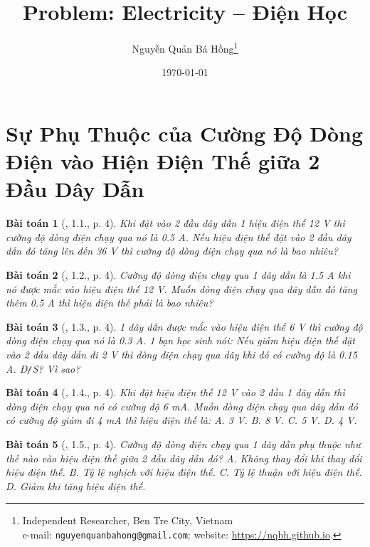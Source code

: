\documentclass{article}
\title{Problem: Electricity -- Điện Học}
\author{Nguyễn Quản Bá Hồng\footnote{Independent Researcher, Ben Tre City, Vietnam\\e-mail: \texttt{nguyenquanbahong@gmail.com}; website: \url{https://nqbh.github.io}.}}
\date{\today}
\newtheorem{baitoan}{Bài toán}
\begin{document}
\maketitle
\begin{abstract}
	
\end{abstract}
\tableofcontents
\newpage


\section{Sự Phụ Thuộc của Cường Độ Dòng Điện vào Hiện Điện Thế giữa 2 Đầu Dây Dẫn}

\begin{baitoan}[\cite{SBT_Vat_Ly_9}, 1.1., p. 4]
	Khi đặt vào 2 đầu dây dẫn 1 hiệu điện thế \emph{12 V} thì cường độ dòng điện chạy qua nó là \emph{0.5 A}. Nếu hiệu điện thế đặt vào 2 đầu dây dẫn đó tăng lên đến \emph{36 V} thì cường độ dòng điện chạy qua nó là bao nhiêu?
\end{baitoan}

\begin{baitoan}[\cite{SBT_Vat_Ly_9}, 1.2., p. 4]
	Cường độ dòng điện chạy qua 1 dây dẫn là \emph{1.5 A} khi nó được mắc vào hiệu điện thế \emph{12 V}. Muốn dòng điện chạy qua dây dẫn đó tăng thêm \emph{0.5 A} thì hiệu điện thế phải là bao nhiêu?
\end{baitoan}

\begin{baitoan}[\cite{SBT_Vat_Ly_9}, 1.3., p. 4]
	1 dây dẫn được mắc vào hiệu điện thế \emph{6 V} thì cường độ dòng điện chạy qua nó là \emph{0.3 A}. 1 bạn học sinh nói: Nếu giảm hiệu điện thế đặt vào 2 đầu dây dẫn đi \emph{2 V} thì dòng điện chạy qua dây khi đó có cường độ là \emph{0.15 A}. \emph{Đ\texttt{/}S}? Vì sao?
\end{baitoan}

\begin{baitoan}[\cite{SBT_Vat_Ly_9}, 1.4., p. 4]
	Khi đặt hiệu điện thế \emph{12 V} vào 2 đầu 1 dây dẫn thì dòng điện chạy qua nó có cường độ \emph{6 mA}. Muốn dòng điện chạy qua dây dẫn đó có cường độ giảm đi \emph{4 mA} thì hiệu điện thế là: {\sf A.} \emph{3 V}. {\sf B.} \emph{8 V}. {\sf C.} \emph{5 V}. {\sf D.} \emph{4 V}.
\end{baitoan}

\begin{baitoan}[\cite{SBT_Vat_Ly_9}, 1.5., p. 4]
	Cường độ dòng điện chạy qua 1 dây dẫn phụ thuộc như thế nào vào hiệu điện thế giữa 2 đầu dây dẫn đó? {\sf A.} Không thay đổi khi thay đổi hiệu điện thế. {\sf B.} Tỷ lệ nghịch với hiệu điện thế. {\sf C.} Tỷ lệ thuận với hiệu điện thế. {\sf D.} Giảm khi tăng hiệu điện thế.
\end{baitoan}
\end{document}
